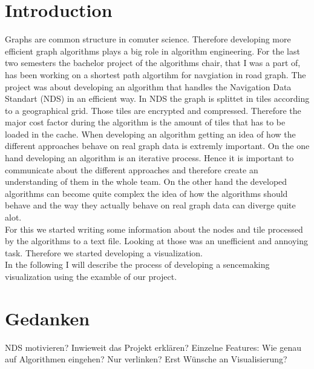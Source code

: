 \documentclass
[
	paper = a4,
    pagesize,
	12 pt,
	oneside,                       %
    open = right,
	DIV = calc,
	BCOR = 0 mm,                   %
	bibtotoc
]
{scrbook}
\begin{document}
\frontmatter







\mainmatter
\chapter{Introduction}


Graphs are common structure in comuter science.
Therefore developing more efficient graph algorithms plays a big role in algorithm engineering.
\newline
For the last two semesters the bachelor project of the algorithms chair, that I was a part of, has been working on a shortest path algortihm for navgiation in road graph.
The project was about developing an algorithm that handles the Navigation Data Standart (NDS) in an efficient way. In NDS the graph is splittet in tiles according to a geographical grid. Those tiles are encrypted and compressed. Therefore the major cost factor during the algorithm is the amount of tiles that has to be loaded in the cache.
\newline
When developing an algorithm getting an idea of how the different approaches behave on real graph data is extremly important.
On the one hand developing an algorithm is an iterative process. Hence it is important to communicate about the different approaches and therefore create an understanding of them in the whole team.
On the other hand the developed algorithms can become quite complex the idea of how the algorithms should behave and the way they actually behave on real graph data can diverge quite alot.
\\
For this we started writing some information about the nodes and tile processed by the algorithms to a text file.
Looking at those was an unefficient and annoying task. Therefore we started developing a visualization.\\
In the following I will describe the process of developing a sencemaking visualization using the examble of our project.


\chapter{Gedanken}
NDS motivieren?
Inwieweit das Projekt erklären?
Einzelne Features:
Wie genau auf Algorithmen eingehen?
Nur verlinken?
Erst Wünsche an Visualisierung?
\end{document}

